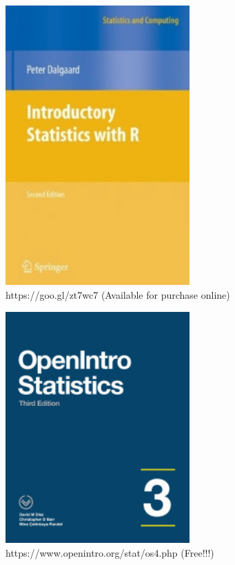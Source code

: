 \documentclass[]{book}
\begin{document}
\begin{figure}

{\centering \includegraphics[width=2.78in]{figure/book1v2} 

}

\caption{https://goo.gl/zt7wc7 (Available for purchase online)}\label{fig:book1}
\end{figure}

\begin{figure}

{\centering \includegraphics[width=2.78in]{figure/openintro.v2} 

}

\caption{https://www.openintro.org/stat/os4.php (Free!!!)}\label{fig:book2}
\end{figure}
\end{document}
